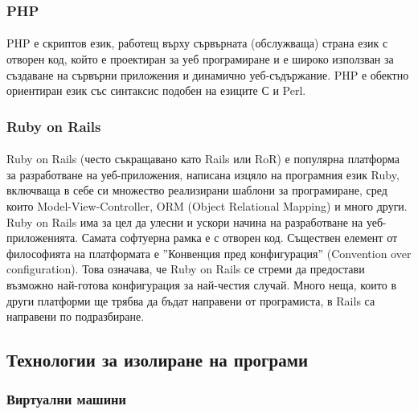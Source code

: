 \documentclass[pdftex,14pt,a4paper]{extreport}
\begin{document}
\subsubsection {PHP}
\paragraph {}
PHP е скриптов език, работещ върху сървърната (обслужваща) страна език с отворен код, който е проектиран за уеб програмиране и е широко използван за създаване на сървърни приложения и динамично уеб-съдържание. PHP е обектно ориентиран език със синтаксис подобен на езиците С и Perl.
\subsubsection {Ruby on Rails}
\paragraph {}
Ruby on Rails (често съкращавано като Rails или RoR) е популярна платформа за разработване на уеб-приложения, написана изцяло на програмния език Ruby, включваща в себе си множество реализирани шаблони за програмиране, сред които Model-View-Controller, ORM (Object Relational Mapping) и много други. Ruby on Rails има за цел да улесни и ускори начина на разработване на уеб-приложенията. Самата софтуерна рамка е с отворен код. Съществен елемент от философията на платформата е ''Конвенция пред конфигурация'' (Convention over configuration). Това означава, че Ruby on Rails се стреми да предостави възможно най-готова конфигурация за най-честия случай. Много неща, които в други платформи ще трябва да бъдат направени от програмиста, в Rails са направени по подразбиране.
\subsection {Технологии за изолиране на програми}
\subsubsection {Виртуални машини}
\end{document}
